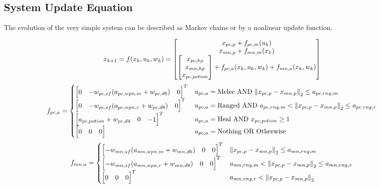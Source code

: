 \documentclass[letterpaper, 10 pt, conference]{ieeeconf}
\begin{document}
\subsection{System Update Equation}
The evolution of the very simple system can be described as Markov chains or by a nonlinear update function.

\begin{figure}[t]
    \begin{equation}\label{eq:sys_update_fun}
        x_{k+1} = f(x_k, u_k, w_k) = \mqty[
            x_{pc,p} + f_{pc,m}(u_k)\\
            x_{mn,p} + f_{mn,m}(x_k)\\
            \mqty[x_{pc,hp}\\ x_{mn,hp} \\ x_{pc,potion}] + f_{pc,a}(x_k,u_k,w_k) + f_{mn,a}(x_k,w_k)
        ]
    \end{equation}
    \begin{equation}\label{eq:f_pc_a}
        f_{pc,a} = \begin{cases}
            \mqty[0 & -w_{pc,sf}(a_{pc,wpn,m} + w_{pc,d6}) & 0]^T & u_{pc,a} = \text{Melee} \text{ AND } \norm{x_{pc,p} - x_{mn,p}}_2 \leq a_{pc,rng,m}\\
            \mqty[0 & -w_{pc,sf}(a_{pc,wpn,r} + w_{pc,d8}) & 0]^T & u_{pc,a} = \text{Ranged} \text{ AND } a_{pc,rng,m} < \norm{x_{pc,p} - x_{mn,p}}_2 \leq a_{pc,rng,r}\\
            \mqty[a_{pc,potion} + w_{pc,d4} & 0 & -1]^T & u_{pc,a} = \text{Heal} \text{ AND } x_{pc,potion} \geq 1\\%
            \mqty[0 & 0 & 0] & u_{pc,a} = \text{Nothing} \text{ OR } \text{Otherwise}
        \end{cases}
    \end{equation}
    \begin{equation}\label{eq:f_mn_a}
        f_{mn,a} = \begin{cases}
            \mqty[-w_{mn,sf}(a_{mn,wpn,m} + w_{mn,d6}) & 0 & 0]^T & \norm{x_{pc,p} - x_{mn,p}}_2 \leq a_{mn,rng,m}\\
            \mqty[- w_{mn,sf}(a_{mn,wpn,r} + w_{mn,d8}) & 0 & 0]^T & a_{mn,rng,m} < \norm{x_{pc,p} - x_{mn,p}}_2 \leq  a_{mn,rng,r}\\
            \mqty[0 & 0 & 0]^T &  a_{mn,rng,r} < \norm{x_{pc,p} - x_{mn,p}}_2
        \end{cases}
    \end{equation}
\end{figure}
\end{document}
